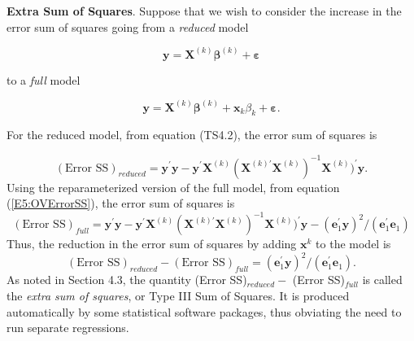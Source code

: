 \textbf{Extra Sum of Squares}. Suppose that we wish to consider the increase
in the error sum of squares going from a \textit{reduced} model
\begin{center}
\[
\mathbf{y}=\mathbf{X}^{(k)}\boldsymbol \beta^{(k)}+ \boldsymbol
\varepsilon
\]
\end{center}
to a \textit{full} model
\begin{center}
\[
\mathbf{y}=\mathbf{X}^{(k)}\boldsymbol
\beta^{(k)}+\mathbf{x}_{k}\beta _{k}+ \boldsymbol \varepsilon.
\]
\end{center}
For the reduced model, from equation (TS4.2), the error sum of
squares is

\begin{equation}\label{E5:ESSReduced}
(\text{Error SS})_{reduced}=\mathbf{y}^{\prime }\mathbf{y}-\mathbf{y}%
^{\prime }\mathbf{X}^{(k)}(\mathbf{X}^{(k)\prime }\mathbf{X}^{(k)})^{-1}%
\mathbf{X}^{(k)})^{\prime }\mathbf{y}.
\end{equation}
Using the reparameterized version of the full model, from equation
(\ref{E5:OVErrorSS}), the error sum of squares is
\begin{equation}\label{E5:ESSFull}
(\text{Error SS})_{full}=\mathbf{y}^{\prime }\mathbf{y}-\mathbf{y}^{\prime }%
\mathbf{X}^{(k)}(\mathbf{X}^{(k)\prime }\mathbf{X}^{(k)})^{-1}\mathbf{X}%
^{(k)})^{\prime }\mathbf{y}-\left( \mathbf{e}_{1}^{\prime }\mathbf{y}%
\right) ^{2}/\left( \mathbf{e}_{1}^{\prime }\mathbf{e}%
_{1}\right)
\end{equation}
Thus, the reduction in the error sum of squares by adding
$\mathbf{x}^{k}$ to the model is
\begin{equation}\label{E5:ESSReduction}
(\text{Error SS})_{reduced}-(\text{Error SS})_{full}=\left( \mathbf{e}%
_{1}^{\prime }\mathbf{y}\right) ^{2}/\left( \mathbf{e}_{1}^{\prime }%
\mathbf{e}_{1}\right) .
\end{equation}
As noted in Section 4.3, the quantity (Error SS)$_{reduced}-$ (Error SS)$%
_{full}$ is called the \textit{extra sum of squares}, or Type III Sum of
Squares. It is produced automatically by some statistical software packages,
thus obviating the need to run separate regressions.

